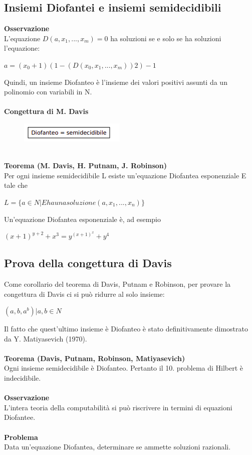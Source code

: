 \subsection{Insiemi Diofantei e insiemi semidecidibili}
\textbf{Osservazione}\\
L’equazione $D(a, x_1, . . . , x_m ) = 0$ ha soluzioni se e solo se ha soluzioni l’equazione:
\begin{center}
    $a = (x_0 + 1)(1 - (D(x_0, x_1, . . . , x_m))2) - 1$
\end{center}
Quindi, un insieme Diofanteo è l’insieme dei valori positivi assunti da un polinomio con variabili in N.\\\\
\textbf{Congettura di M. Davis}\\
\begin{figure}[htp]
    \centering
    \includegraphics[scale=0.9]{tesi_stile/img/semi6.png}
\end{figure}\\
\textbf{Teorema (M. Davis, H. Putnam, J. Robinson)}\\
Per ogni insieme semidecidibile L esiste un’equazione Diofantea esponenziale E tale che
\begin{center}
    $L = \{a \in N | E ha una soluzione (a, x_1, . . . , x_n )\}$
\end{center}
Un’equazione Diofantea esponenziale è, ad esempio
\begin{center}
    $(x + 1)^{y+2} + x^3 = y^{(x+1)^x}+ y^4$
\end{center}
\subsection{Prova della congettura di Davis}
Come corollario del teorema di Davis, Putnam e Robinson, per provare la congettura di Davis ci si può ridurre al solo insieme:
\begin{center}
    ${(a, b, a^b) | a, b \in N}$
\end{center}
Il fatto che quest’ultimo insieme è Diofanteo è stato definitivamente dimostrato da Y. Matiyasevich (1970).\\\\
\textbf{Teorema (Davis, Putnam, Robinson, Matiyasevich)}\\
Ogni insieme semidecidibile è Diofanteo. Pertanto il 10. problema di Hilbert è indecidibile.\\\\
\textbf{Osservazione}\\
L’intera teoria della computabilità si può riscrivere in termini di equazioni Diofantee.\\\\
\textbf{Problema}\\
Data un’equazione Diofantea, determinare se ammette soluzioni razionali.




